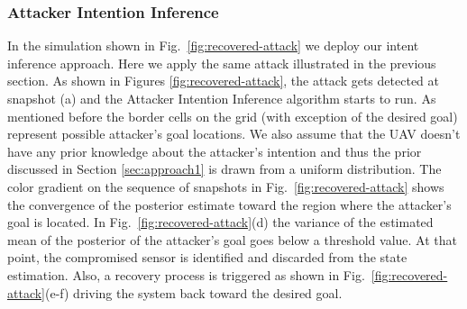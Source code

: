 \documentclass[letterpaper, 10 pt, conference]{ieeeconf}  %
\begin{document}

\subsubsection{Attacker Intention Inference}
In the simulation shown in Fig.~\ref{fig:recovered-attack} we deploy our intent inference approach. Here we apply the same attack illustrated in the previous section. 
As shown in Figures \ref{fig:recovered-attack}, the attack gets detected at snapshot (a) and the Attacker Intention Inference algorithm starts to run. 
As mentioned before the border cells on the grid (with exception of the desired goal) represent possible attacker's goal locations. We also assume that the UAV doesn't have any prior knowledge about the attacker's intention and thus the prior discussed in Section \ref{sec:approach1} is drawn from a uniform distribution. The color gradient on the sequence of snapshots in Fig.~\ref{fig:recovered-attack} shows the convergence of the posterior estimate toward the region where the attacker's goal is located. In Fig.~\ref{fig:recovered-attack}(d) the variance of the estimated mean of the posterior of the attacker's goal goes below a threshold value. At that point, the compromised sensor is identified and discarded from the state estimation. Also, a recovery process is triggered as shown in Fig.~\ref{fig:recovered-attack}(e-f) driving the system back toward the desired goal. 

\end{document}
